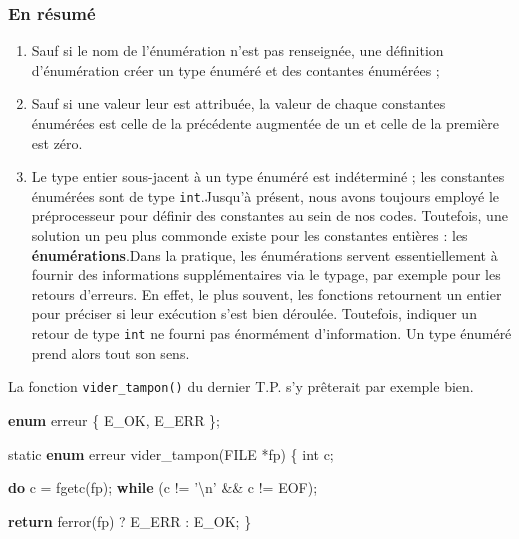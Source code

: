 \documentclass[]{article}
\date{}
\newenvironment{Shaded}{}{}
\newcommand{\KeywordTok}[1]{\textcolor[rgb]{0.00,0.44,0.13}{\textbf{{#1}}}}
\newcommand{\DataTypeTok}[1]{\textcolor[rgb]{0.56,0.13,0.00}{{#1}}}
\newcommand{\CharTok}[1]{\textcolor[rgb]{0.25,0.44,0.63}{{#1}}}
\newcommand{\ControlFlowTok}[1]{\textcolor[rgb]{0.00,0.44,0.13}{\textbf{{#1}}}}
\newcommand{\NormalTok}[1]{{#1}}
\providecommand{\tightlist}{%
  \setlength{\itemsep}{0pt}\setlength{\parskip}{0pt}}
\begin{document}
{
\setcounter{tocdepth}{3}
\tableofcontents
}
\subsubsection{En résumé}\label{en-ruxe9sumuxe9}

\begin{enumerate}
\def\labelenumi{\arabic{enumi}.}
\tightlist
\item
  Sauf si le nom de l'énumération n'est pas renseignée, une définition
  d'énumération créer un type énuméré et des contantes énumérées ;
\item
  Sauf si une valeur leur est attribuée, la valeur de chaque constantes
  énumérées est celle de la précédente augmentée de un et celle de la
  première est zéro.
\item
  Le type entier sous-jacent à un type énuméré est indéterminé ; les
  constantes énumérées sont de type \texttt{int}.Jusqu'à présent, nous
  avons toujours employé le préprocesseur pour définir des constantes au
  sein de nos codes. Toutefois, une solution un peu plus commonde existe
  pour les constantes entières : les \textbf{énumérations}.Dans la
  pratique, les énumérations servent essentiellement à fournir des
  informations supplémentaires via le typage, par exemple pour les
  retours d'erreurs. En effet, le plus souvent, les fonctions retournent
  un entier pour préciser si leur exécution s'est bien déroulée.
  Toutefois, indiquer un retour de type \texttt{int} ne fourni pas
  énormément d'information. Un type énuméré prend alors tout son sens.
\end{enumerate}

La fonction \texttt{vider\_tampon()} du dernier T.P. s'y prêterait par
exemple bien.

\begin{Shaded}
\begin{Highlighting}[]
\KeywordTok{enum} \NormalTok{erreur \{ E_OK, E_ERR \};}


\DataTypeTok{static} \KeywordTok{enum} \NormalTok{erreur vider_tampon(FILE *fp)}
\NormalTok{\{}
    \DataTypeTok{int} \NormalTok{c;}

    \ControlFlowTok{do}
        \NormalTok{c = fgetc(fp);}
    \ControlFlowTok{while} \NormalTok{(c != }\CharTok{'\textbackslash{}n'} \NormalTok{&& c != EOF);}

    \ControlFlowTok{return} \NormalTok{ferror(fp) ? E_ERR : E_OK;}
\NormalTok{\}}
\end{Highlighting}
\end{Shaded}
\end{document}
